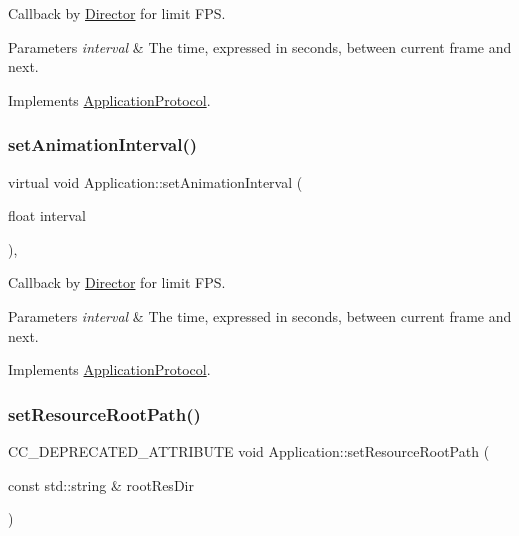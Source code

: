 Callback by \hyperlink{classDirector}{Director} for limit F\+PS. 


\begin{DoxyParams}{Parameters}
{\em interval} & The time, expressed in seconds, between current frame and next. \\
\hline
\end{DoxyParams}


Implements \hyperlink{classApplicationProtocol_ac69ac0f01aaba7cc8654ec7cce4eb88f}{Application\+Protocol}.

\mbox{\label{classApplication_af04c472d3fac0d922d088896504925ac}} 
\subsubsection{\texorpdfstring{set\+Animation\+Interval()}{setAnimationInterval()}\hspace{0.1cm}{\footnotesize\ttfamily [12/12]}}
{\footnotesize\ttfamily virtual void Application\+::set\+Animation\+Interval (\begin{DoxyParamCaption}\item[{float}]{interval }\end{DoxyParamCaption})\hspace{0.3cm}{\ttfamily [override]}, {\ttfamily [virtual]}}



Callback by \hyperlink{classDirector}{Director} for limit F\+PS. 


\begin{DoxyParams}{Parameters}
{\em interval} & The time, expressed in seconds, between current frame and next. \\
\hline
\end{DoxyParams}


Implements \hyperlink{classApplicationProtocol_ac69ac0f01aaba7cc8654ec7cce4eb88f}{Application\+Protocol}.

\mbox{\label{classApplication_a0df1abee182d6a9f3d2a318941aace4f}} 
\subsubsection{\texorpdfstring{set\+Resource\+Root\+Path()}{setResourceRootPath()}\hspace{0.1cm}{\footnotesize\ttfamily [1/8]}}
{\footnotesize\ttfamily C\+C\+\_\+\+D\+E\+P\+R\+E\+C\+A\+T\+E\+D\+\_\+\+A\+T\+T\+R\+I\+B\+U\+TE void Application\+::set\+Resource\+Root\+Path (\begin{DoxyParamCaption}\item[{const std\+::string \&}]{root\+Res\+Dir }\end{DoxyParamCaption})}

